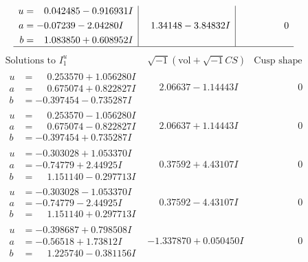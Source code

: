 \documentclass[1p]{elsarticle_modified}
\theoremstyle{definition}
\newcommand{\I}{\sqrt{-1}}
\begin{document}
$$\begin{array}{c|c|c}
\begin{aligned}
u &= \phantom{-}0.042485 - 0.916931 I \\
a &= -0.07239 - 2.04280 I \\
b &= \phantom{-}1.083850 + 0.608952 I\end{aligned}
 & \phantom{-}1.34148 - 3.84832 I & \phantom{-0.000000 } 0\\
 \hline 
 \end{array}$$\newpage$$\begin{array}{c|c|c}  
\text{Solutions to }I^u_{1}& \I (\text{vol} + \sqrt{-1}CS) & \text{Cusp shape}\\
 \hline 
\begin{aligned}
u &= \phantom{-}0.253570 + 1.056280 I \\
a &= \phantom{-}0.675074 + 0.822827 I \\
b &= -0.397454 - 0.735287 I\end{aligned}
 & \phantom{-}2.06637 - 1.14443 I & \phantom{-0.000000 } 0 \\ \hline\begin{aligned}
u &= \phantom{-}0.253570 - 1.056280 I \\
a &= \phantom{-}0.675074 - 0.822827 I \\
b &= -0.397454 + 0.735287 I\end{aligned}
 & \phantom{-}2.06637 + 1.14443 I & \phantom{-0.000000 } 0 \\ \hline\begin{aligned}
u &= -0.303028 + 1.053370 I \\
a &= -0.74779 + 2.44925 I \\
b &= \phantom{-}1.151140 - 0.297713 I\end{aligned}
 & \phantom{-}0.37592 + 4.43107 I & \phantom{-0.000000 } 0 \\ \hline\begin{aligned}
u &= -0.303028 - 1.053370 I \\
a &= -0.74779 - 2.44925 I \\
b &= \phantom{-}1.151140 + 0.297713 I\end{aligned}
 & \phantom{-}0.37592 - 4.43107 I & \phantom{-0.000000 } 0 \\ \hline\begin{aligned}
u &= -0.398687 + 0.798508 I \\
a &= -0.56518 + 1.73812 I \\
b &= \phantom{-}1.225740 - 0.381156 I\end{aligned}
 & -1.337870 + 0.050450 I & \phantom{-0.000000 } 0 \\ \hline\begin{aligned}

\end{aligned}
\end{array}$$
\end{document}
